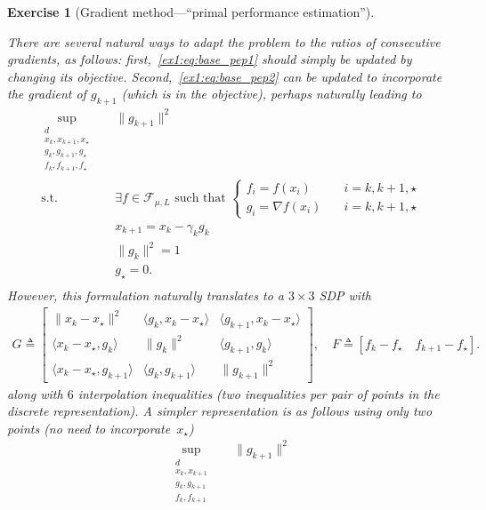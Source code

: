 \documentclass[11pt,a4paper]{article}
\newcommand{\inner}[2]{{\langle #1, #2\rangle}}
\newtheorem{exercise}{Exercise}
\begin{document}
\begin{exercise}[Gradient method---``primal performance estimation'']
\begin{enumerate}
{	There are several natural ways to adapt the problem to the ratios of consecutive gradients, as follows: first,~\eqref{ex1:eq:base_pep1} should simply be updated by changing its objective. Second,~\eqref{ex1:eq:base_pep2} can be updated to incorporate the gradient of $g_{k+1}$ (which is in the objective), perhaps naturally leading to
	\begin{equation*}
		\begin{aligned}
		\sup_{\substack{d\\x_k,x_{k+1},x_\star\\g_k,g_{k+1},g_\star\\f_k,f_{k+1},f_\star}} \quad & \|g_{k+1}\|^2\\
		\text{s.t. } & \exists f\in\mathcal{F}_{\mu,L} \text{ such that }\left\{\begin{array}{ll}
			f_i=f(x_i)\quad & i=k,k+1,\star\\
			g_i=\nabla f(x_i)\quad & i=k,k+1,\star
			\end{array}\right.\\
		& x_{k+1}=x_k-\gamma_k  g_k\\
		& \|g_k\|^2= 1\\
		& g_\star=0.\\
		\end{aligned}
		\end{equation*}
	However, this formulation naturally translates to a $3\times 3$ SDP with
			\begin{align*}
			G \triangleq \begin{bmatrix}
			\|x_k-x_\star\|^2 & \inner{ g_k}{x_k-x_\star} & \inner{g_{k+1}}{x_k-x_\star}\\
			\inner{x_k-x_\star}{g_k} & \| g_k\|^2 & \inner{ g_{k+1}}{g_k}\\
			\inner{x_k-x_\star}{g_{k+1}} & \inner{g_k}{g_{k+1}} & \|g_{k+1}\|^2
			\end{bmatrix},\quad 	F \triangleq 			[f_k-f_\star\quad f_{k+1}-f_\star].
			\end{align*}
	along with $6$ interpolation inequalities (two inequalities per pair of points in the discrete representation). A simpler representation is as follows using only two points (no need to incorporate~$x_\star$)
	\begin{equation*}
		\begin{aligned}
		\sup_{\substack{d\\x_k,x_{k+1}\\g_k,g_{k+1}\\f_k,f_{k+1}}} \quad & \|g_{k+1}\|^2\\

\end{aligned}
\end{equation*}}
\end{enumerate}
\end{exercise}
\end{document}
